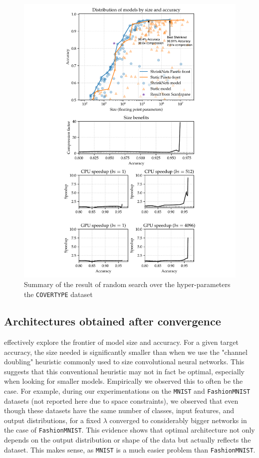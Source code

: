 \begin{figure}[tb]
\begin{minipage}{2.7in}
\centering\includegraphics[width=\columnwidth]{COVER_FC_summary-arrows}
\vspace*{-10mm}
\caption{\label{figure_COVER} Summary of the result of random
search over the hyper-parameters the \texttt{COVERTYPE} dataset
}
\vspace*{-5mm}
\end{minipage}
\end{figure}


\subsection{Architectures obtained after convergence}
\shrink effectively explore the frontier of model size and accuracy. For a
given target accuracy, the size needed is significantly smaller than when we use the
"channel doubling" heuristic commonly used to size convolutional neural networks.
This suggests that this conventional heuristic may not in fact be optimal,
especially when looking for smaller models.  Empirically we observed this to
often be the case.  For example, during our experimentations on the
\texttt{MNIST} \cite{Lecun1998} and \texttt{FashionMNIST} \cite{Xiao2017}
datasets (not reported here due to space constraints), we observed that even
though these datasets have the same number of classes, input features, and
output distributions, for a fixed $\lambda$ \shrink converged to
considerably bigger networks in the case of \texttt{FashionMNIST}. This evidence
shows that optimal architecture not only depends on the output distribution or
shape of the data but actually reflects the dataset.  This makes sense, as
\texttt{MNIST} is a much easier problem than \texttt{FashionMNIST}.

